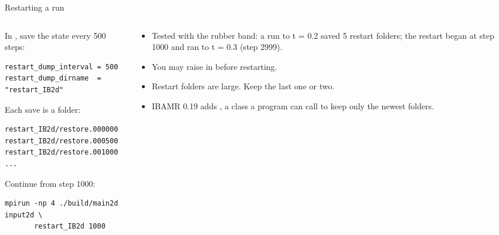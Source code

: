 \documentclass[aspectratio=169,11pt]{beamer}
\begin{document}
\begin{frame}[fragile]{Restarting a run}
\begin{columns}[T,onlytextwidth]
\begin{column}{0.50\textwidth}
In , save the state every 500 steps:
\begin{lstlisting}
restart_dump_interval = 500
restart_dump_dirname  = "restart_IB2d"
\end{lstlisting}
Each save is a folder:
\begin{lstlisting}
restart_IB2d/restore.000000
restart_IB2d/restore.000500
restart_IB2d/restore.001000  ...
\end{lstlisting}
Continue from step 1000:
\begin{lstlisting}[style=shell]
mpirun -np 4 ./build/main2d input2d \
       restart_IB2d 1000
\end{lstlisting}
\end{column}
\begin{column}{0.47\textwidth}
\begin{itemize}\small
  \item Tested with the rubber band: a run to t = 0.2 saved 5 restart folders; the restart began at step 1000 and ran to t = 0.3 (step 2999).
  \item You may raise \code{END\_TIME} in \code{input2d} before restarting.
  \item Restart folders are large. Keep the last one or two.
  \item IBAMR 0.19 adds , a class a program can call to keep only the newest folders.
\end{itemize}
\end{column}
\end{columns}
\end{frame}
\end{document}
